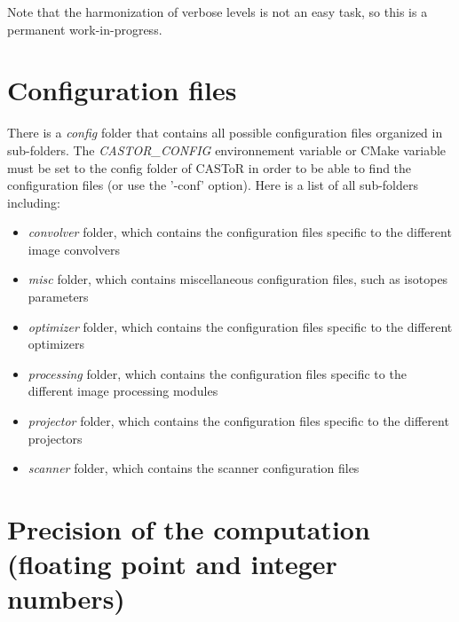 \documentclass[a4paper, 11pt]{article}
\begin{document}
Note that the harmonization of verbose levels is not an easy task, so this is a permanent work-in-progress.

\section{Configuration files}

There is a \textit{config} folder that contains all possible configuration files organized in sub-folders.
The \textit{CASTOR\_CONFIG} environnement variable or CMake variable must be set to the config folder of CASToR in order to be able to find the configuration files (or use the '-conf' option).
Here is a list of all sub-folders including:
\begin{itemize}
  \item \textit{convolver} folder, which contains the configuration files specific to the different image convolvers
  \item \textit{misc} folder, which contains miscellaneous configuration files, such as isotopes parameters
  \item \textit{optimizer} folder, which contains the configuration files specific to the different optimizers
  \item \textit{processing} folder, which contains the configuration files specific to the different image processing modules
  \item \textit{projector} folder, which contains the configuration files specific to the different projectors
  \item \textit{scanner} folder, which contains the scanner configuration files
\end{itemize}

\section{Precision of the computation (floating point and integer numbers)}
\end{document}
